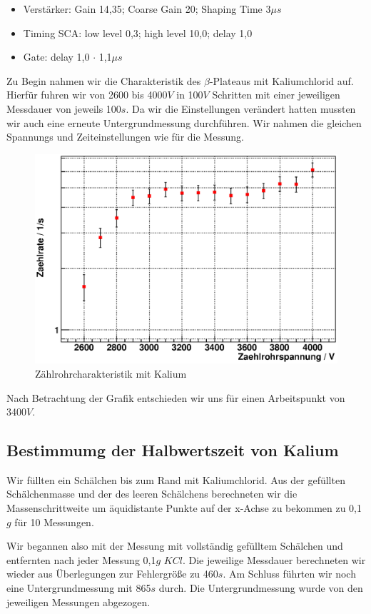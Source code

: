 \documentclass[12pt]{article}
\begin{document}
\begin{itemize}
 \item Verstärker: Gain 14,35; Coarse Gain 20; Shaping Time 3$\mu s$
 \item Timing SCA: low level 0,3; high level 10,0; delay 1,0
 \item Gate: delay 1,0 $\cdot$ 1,1$\mu s$
\end{itemize}

Zu Begin nahmen wir die Charakteristik des $\beta$-Plateaus mit Kaliumchlorid auf. Hierfür fuhren wir von 2600 bis 4000$V$ in 100$V$ Schritten mit einer jeweiligen
Messdauer von jeweils 100$s$.
Da wir die Einstellungen verändert hatten mussten wir auch eine erneute Untergrundmessung durchführen. Wir nahmen die gleichen Spannungs und Zeiteinstellungen wie für die Messung.

\begin{figure}[H]  
\centering
\includegraphics[width=0.9\linewidth]{pictures/char_kalium.eps}
\caption{Zählrohrcharakteristik mit Kalium}
\end{figure}

Nach Betrachtung der Grafik entschieden wir uns für einen Arbeitspunkt von 3400$V$.

\subsection{Bestimmumg der Halbwertszeit von Kalium}
Wir füllten ein Schälchen bis zum Rand mit Kaliumchlorid. Aus der gefüllten Schälchenmasse und der des leeren Schälchens berechneten wir die Massenschrittweite um äquidistante Punkte auf der x-Achse zu bekommen zu 0,1$g$ für 10 Messungen.

Wir begannen also mit der Messung mit vollständig gefülltem Schälchen und entfernten nach jeder Messung 0,1$g$ $KCl$. Die jeweilige Messdauer berechneten wir wieder aus Überlegungen zur Fehlergröße zu 460$s$. Am Schluss führten wir noch eine Untergrundmessung mit 865$s$ durch. Die Untergrundmessung wurde von den jeweiligen Messungen abgezogen.
\end{document}
